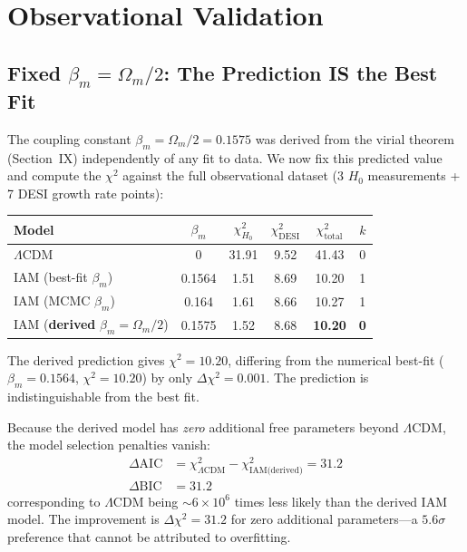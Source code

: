 \documentclass[aps,prd,twocolumn,superscriptaddress,nofootinbib]{revtex4-2}
\begin{document}
\section{Observational Validation}
\label{sec:validation}

\subsection{Fixed $\beta_m = \Omega_m/2$: The Prediction IS the Best Fit}

The coupling constant $\beta_m = \Omega_m/2 = 0.1575$ was derived from the virial theorem (Section~IX) independently of any fit to data. We now fix this predicted value and compute the $\chi^2$ against the full observational dataset (3 $H_0$ measurements + 7 DESI growth rate points):

\begin{center}
\begin{tabular}{lccccc}
\hline
Model & $\beta_m$ & $\chi^2_{H_0}$ & $\chi^2_\text{DESI}$ & $\chi^2_\text{total}$ & $k$ \\
\hline
$\Lambda$CDM & 0 & 31.91 & 9.52 & 41.43 & 0 \\
IAM (best-fit $\beta_m$) & 0.1564 & 1.51 & 8.69 & 10.20 & 1 \\
IAM (MCMC $\beta_m$) & 0.164 & 1.61 & 8.66 & 10.27 & 1 \\
IAM (\textbf{derived} $\beta_m = \Omega_m/2$) & 0.1575 & 1.52 & 8.68 & \textbf{10.20} & \textbf{0} \\
\hline
\end{tabular}
\end{center}

The derived prediction gives $\chi^2 = 10.20$, differing from the numerical best-fit ($\beta_m = 0.1564$, $\chi^2 = 10.20$) by only $\Delta\chi^2 = 0.001$. The prediction is indistinguishable from the best fit.

Because the derived model has \textit{zero} additional free parameters beyond $\Lambda$CDM, the model selection penalties vanish:
\begin{align}
\Delta\text{AIC} &= \chi^2_{\Lambda\text{CDM}} - \chi^2_\text{IAM(derived)} = 31.2 \nonumber \\
\Delta\text{BIC} &= 31.2
\end{align}
corresponding to $\Lambda$CDM being $\sim$$6 \times 10^6$ times less likely than the derived IAM model. The improvement is $\Delta\chi^2 = 31.2$ for zero additional parameters---a $5.6\sigma$ preference that cannot be attributed to overfitting.
\end{document}
